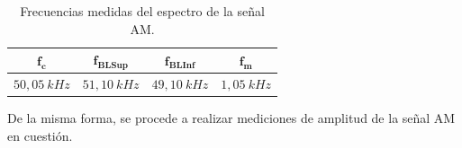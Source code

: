       \begin{table}[H]
        \centering
      \begin{tabular}{cccc} \hline \hline
          $\mathbf{f_c} $        &   $\mathbf{f_{BLSup}}$   &   $\mathbf{f_{BLInf}}$    &   $\mathbf{f_m}$  \\ \hline
          $50,05~kHz$   &   $51,10~kHz$   &    $49,10~kHz$   &   $1,05~kHz$   \\ \hline \hline
        \end{tabular}
        \caption{Frecuencias medidas del espectro de la señal AM.}
        \label{tab:MedicionesFreqAMSeno}
      \end{table}

      De la misma forma, se procede a realizar mediciones de amplitud de la señal AM en cuestión. 

